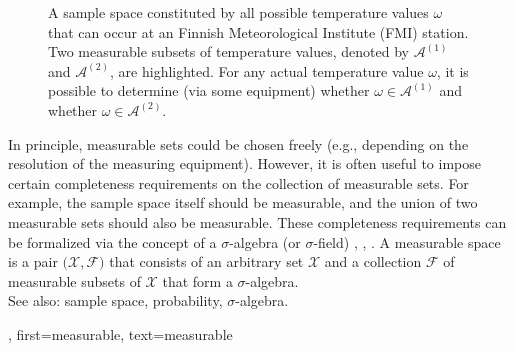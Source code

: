 {{{\begin{figure}[H]
\begin{center}
			\vspace*{10mm}
			\end{center}
			\caption{A sample space constituted by all possible temperature values $\omega$ 
			that can occur at an Finnish Meteorological Institute (FMI) station. Two measurable subsets of temperature 
			values, denoted by $\mathcal{A}^{(1)}$ and $\mathcal{A}^{(2)}$, are highlighted. For any 
			actual temperature value $\omega$, it is possible to determine (via some equipment) 
			whether $\omega \in \mathcal{A}^{(1)}$ and whether $\omega \in \mathcal{A}^{(2)}$. \label{fig_measurable_dict}} 
		\end{figure}
		In principle, measurable sets could be chosen freely (e.g., depending on the resolution of the 
		measuring equipment). However, it is often useful to impose certain completeness requirements 
		on the collection of measurable sets. For example, the sample space itself should be 
		measurable, and the union of two measurable sets should also be measurable. These completeness 
		requirements can be formalized via the concept of a $\sigma$-algebra (or $\sigma$-field) 
		\cite{RudinBook}, \cite{BillingsleyProbMeasure}, \cite{durrett2010probability}. 
		A measurable space is a pair $\big(\mathcal{X},\mathcal{F}\big)$ that consists of an arbitrary 
		set $\mathcal{X}$ and a collection $\mathcal{F}$ of measurable subsets of $\mathcal{X}$ 
		that form a $\sigma$-algebra. 
		\\
		See also: sample space, probability, $\sigma$-algebra.},
	first={measurable},
	text={measurable} 
}

}
